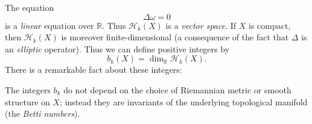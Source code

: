 \documentclass[12pt,letterpaper,reqno]{article}
\numberwithin{equation}{section}
\newcommand{\cH}{\ensuremath{\mathcal H}}
\newcommand{\R}{\ensuremath{\mathbb R}}
\newcommand{\ti}[1]{\textit{#1}}
\begin{document}
The equation
\begin{equation} \label{eq:laplace}
\Delta \omega = 0
\end{equation}
is a \ti{linear} equation over $\R$.
Thus $\cH_k(X)$ is a \ti{vector space}.
If $X$ is compact, then $\cH_k(X)$ is moreover finite-dimensional (a consequence of
the fact that $\Delta$ is an \ti{elliptic} operator). Thus we can define
positive integers by
\begin{equation}
  b_k(X) = \dim_\R \cH_k(X).
\end{equation}
There is a remarkable fact about these integers:
\begin{fact} \label{fact:betti-numbers-are-topological} The integers $b_k$ do not depend on the choice of Riemannian metric or smooth
structure on $X$; instead they are invariants of the underlying topological manifold
(the \ti{Betti numbers}).
\end{fact}
\end{document}

